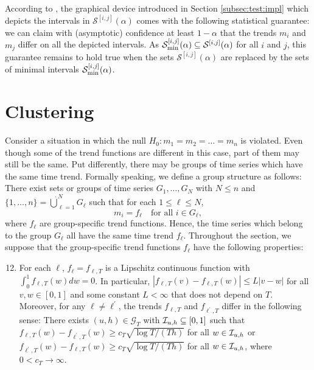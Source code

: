 \documentclass[12pt]{article}
\makeatletter
\renewcommand{\eqref}[1]{\tagform@{\ref{#1}}}
\makeatother
\begin{document}
\begin{remark}
According to \eqref{eq:CS-v2}, the graphical device introduced in Section \ref{subsec:test:impl} which depicts the intervals in $\mathcal{S}^{[i, j]}(\alpha)$ comes with the following statistical guarantee: we can claim with (asymptotic) confidence at least $1-\alpha$ that the trends $m_i$ and $m_j$ differ on all the depicted intervals. As $\mathcal{S}^{[i, j]}_{\textnormal{min}}(\alpha) \subseteq \mathcal{S}^{[i, j]}(\alpha)$ for all $i$ and $j$, this guarantee remains to hold true when the sets $\mathcal{S}^{[i, j]}(\alpha)$ are replaced by the sets of minimal intervals $\mathcal{S}_{\textnormal{min}}^{[i, j]}(\alpha)$.
\end{remark}



\section{Clustering}\label{sec:clustering}


Consider a situation in which the null $H_0: m_1 = m_2 = \ldots = m_n$ is violated. Even though some of the trend functions are different in this case, part of them may still be the same. Put differently, there may be groups of time series which have the same time trend. Formally speaking, we define a group structure as follows: There exist sets or groups of time series $G_1,\ldots, G_N$ with $N \le n$ and $\{1,\ldots, n\} = \mathbin{\dot{\bigcup}}_{\ell=1}^{N} G_\ell$ such that for each $1 \le \ell \le N$,
\[ m_i = f_\ell \quad \text{for all } i \in G_\ell, \] 
where $f_\ell$ are group-specific trend functions. Hence, the time series which belong to the group $G_\ell$ all have the same time trend $f_\ell$. Throughout the section, we suppose that the group-specific trend functions $f_\ell$ have the following properties: 
\begin{enumerate}[label=(C\arabic*),leftmargin=1.2cm,topsep=3pt]
\setcounter{enumi}{11}
\item \label{C-clustering} For each $\ell$, $f_\ell = f_{\ell,T}$ is a Lipschitz continuous function with $\int_0^1 f_{\ell,T}(w) dw = 0$. In particular, $|f_{\ell,T}(v) - f_{\ell,T}(w)| \le L |v-w|$ for all $v, w \in [0,1]$ and some constant $L < \infty$ that does not depend on $T$. Moreover, for any $\ell \ne \ell^\prime$, the trends $f_{\ell,T}$ and $f_{\ell^\prime,T}$ differ in the following sense: There exists $(u, h) \in \mathcal{G}_T$ with $\mathcal{I}_{u, h} \subseteq [0,1]$ such that $f_{\ell,T}(w) - f_{\ell^\prime,T}(w) \ge c_T \sqrt{\log T/(Th)}$ for all $w \in \mathcal{I}_{u, h}$ or $f_{\ell^\prime,T}(w) - f_{\ell,T}(w) \ge c_T \sqrt{\log T/(Th)}$ for all $w \in \mathcal{I}_{u, h}$, where $0 < c_T \rightarrow \infty$.
\end{enumerate}
\end{document}
